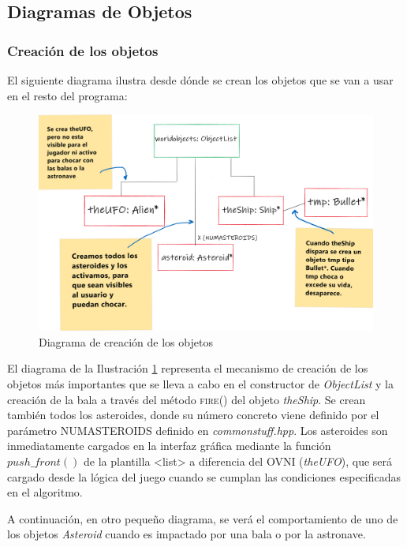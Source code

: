 \subsection{Diagramas de Objetos}
\subsubsection{Creación de los objetos}

El siguiente diagrama ilustra desde dónde se crean los objetos que se van a usar en el resto del programa:

\begin{figure}[H]
    \centering
    \includegraphics[width=\textwidth]{fotos/Creacion.png}
    \caption{Diagrama de creación de los objetos}
    \label{creacion}
\end{figure}

El diagrama de la Ilustración \ref{creacion} representa el mecanismo de creación de los objetos más importantes que se lleva a cabo en el constructor de \emph{ObjectList} y la creación de la bala a través del método \textsc{fire()} del objeto \emph{theShip}. Se crean también todos los asteroides, donde su número concreto viene definido por el parámetro NUMASTEROIDS definido en \emph{commonstuff.hpp}. Los asteroides son inmediatamente cargados en la interfaz gráfica mediante la función $push\_front()$ de la plantilla {\textless list\textgreater} a diferencia del OVNI (\emph{theUFO}), que será cargado desde la lógica del juego cuando se cumplan las condiciones especificadas en el algoritmo.

A continuación, en otro pequeño diagrama, se verá el comportamiento de uno de los objetos \emph{Asteroid} cuando es impactado por una bala o por la astronave.

